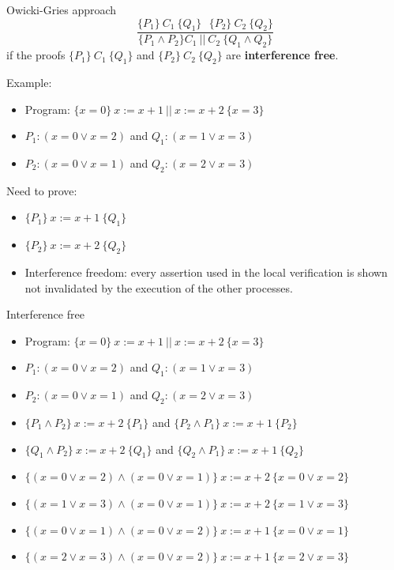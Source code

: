 \documentclass[11pt]{beamer}
\begin{document}
\begin{frame}{Owicki-Gries approach}
  $$\frac{\{P_1\}~C_1~\{Q_1\}~~~\{P_2\}~C_2~\{Q_2\}}{\{P_1 \land P_2\} C_1~||~C_2~\{Q_1 \land Q_2\}}$$
  if the proofs $\{P_1\}~C_1~\{Q_1\}$ and $\{P_2\}~C_2~\{Q_2\}$ are {\bf interference free}.
  \pause

  Example:
  \begin{itemize}
  \item Program: $\{x = 0\}~ x := x + 1 ~||~ x := x + 2 ~\{x = 3\}$
    \pause
    \item $P_1:  (x = 0 \lor x = 2)$ and $Q_1: (x = 1 \lor x = 3)$
    \item $P_2: (x = 0 \lor x = 1)$ and $Q_2: (x = 2 \lor x = 3)$
    \end{itemize}
\pause
Need to prove:
\begin{itemize}
\item $\{P_1\}~ x := x + 1~ \{Q_1\}$
\item $\{P_2\}~ x := x + 2 ~\{Q_2\}$
  \pause
\item Interference freedom: every assertion used in the local verification is
  shown not invalidated by the execution of the other processes.
\end{itemize}
\end{frame}

\begin{frame}{Interference free}
  \begin{itemize}
  \item Program: $\{x = 0\}~ x := x + 1 ~||~ x := x + 2 ~\{x = 3\}$
  \item $P_1:  (x = 0 \lor x = 2)$ and $Q_1: (x = 1 \lor x = 3)$
  \item $P_2: (x = 0 \lor x = 1)$ and $Q_2: (x = 2 \lor x = 3)$
  \item $\{P_1 \land P_2\}~ x := x + 2 ~\{P_1\} $ and $\{P_2 \land P_1\} ~x := x + 1 ~\{P_2\} $
  \item $\{Q_1 \land P_2\}~ x := x + 2 ~\{Q_1\} $ and  $\{Q_2 \land P_1\}~ x := x + 1 ~\{Q_2\} $
    \pause
  \item   $\{(x = 0 \lor x = 2) \land (x = 0 \lor x = 1)\}~x := x + 2~\{x = 0 \lor x = 2\}$
  \item   $\{(x = 1 \lor x = 3) \land (x = 0 \lor x = 1)\}~x := x + 2~\{x = 1 \lor x = 3\}$
  \item   $\{(x = 0 \lor x = 1) \land (x = 0 \lor x = 2)\}~x := x + 1~\{x = 0 \lor x = 1\}$
  \item   $\{(x = 2 \lor x = 3) \land (x = 0 \lor x = 2)\}~x := x + 1~\{x = 2 \lor x = 3\}$
    
\end{itemize}

\end{frame}
\end{document}
